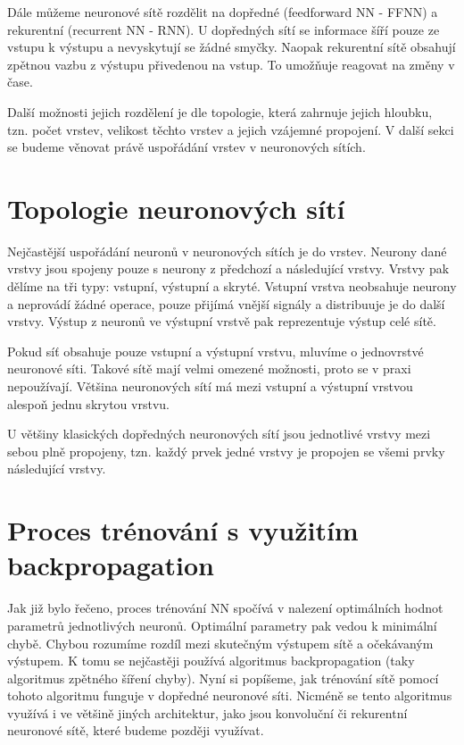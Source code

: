 Dále můžeme neuronové sítě rozdělit na dopředné (feedforward NN - FFNN) a
rekurentní (recurrent NN - RNN). U dopředných sítí se informace šíří pouze ze
vstupu k výstupu a nevyskytují se žádné smyčky. Naopak rekurentní sítě obsahují
zpětnou vazbu z výstupu přivedenou na vstup. To umožňuje reagovat na změny v
čase.

Další možnosti jejich rozdělení je dle topologie, která zahrnuje jejich
hloubku, tzn. počet vrstev, velikost těchto vrstev a jejich vzájemné propojení.
V další sekci se budeme věnovat právě uspořádání vrstev v neuronových sítích.

\section{Topologie neuronových sítí}
Nejčastější uspořádání neuronů v neuronových sítích je do vrstev. Neurony dané
vrstvy jsou spojeny pouze s neurony z předchozí a následující vrstvy. Vrstvy
pak dělíme na tři typy: vstupní, výstupní a skryté. Vstupní vrstva neobsahuje
neurony a neprovádí žádné operace, pouze přijímá vnější signály a distribuuje
je do další vrstvy. Výstup z neuronů ve výstupní vrstvě pak reprezentuje výstup
celé sítě.

Pokud síť obsahuje pouze vstupní a výstupní vrstvu, mluvíme o jednovrstvé
neuronové síti. Takové sítě mají velmi omezené možnosti, proto se v praxi
nepoužívají. Většina neuronových sítí má mezi vstupní a výstupní vrstvou
alespoň jednu skrytou vrstvu.%

U většiny klasických dopředných neuronových sítí jsou jednotlivé vrstvy mezi
sebou plně propojeny, tzn. každý prvek jedné vrstvy je propojen se všemi prvky
následující vrstvy.


\section{Proces trénování s využitím backpropagation}

Jak již bylo řečeno, proces trénování NN spočívá v nalezení optimálních hodnot
parametrů jednotlivých neuronů. Optimální parametry pak vedou k minimální
chybě. Chybou rozumíme rozdíl mezi skutečným výstupem sítě a očekávaným
výstupem. K tomu se nejčastěji používá algoritmus backpropagation (taky
algoritmus zpětného šíření chyby). Nyní si popíšeme, jak trénování sítě pomocí
tohoto algoritmu funguje v dopředné neuronové síti. Nicméně se tento algoritmus
využívá i ve většině jiných architektur, jako jsou konvoluční či rekurentní
neuronové sítě, které budeme později využívat.

